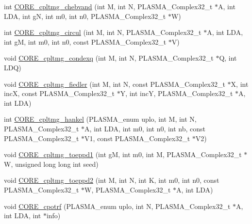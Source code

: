 \begin{DoxyCompactItemize}
\item 
int \hyperlink{group__CORE__PLASMA__Complex32__t_ga9a7cfbd866be2bca2d26375bc6766d8a_ga9a7cfbd866be2bca2d26375bc6766d8a}{C\+O\+R\+E\+\_\+cpltmg\+\_\+chebvand} (int M, int N, P\+L\+A\+S\+M\+A\+\_\+\+Complex32\+\_\+t $\ast$A, int L\+D\+A, int g\+N, int m0, int n0, P\+L\+A\+S\+M\+A\+\_\+\+Complex32\+\_\+t $\ast$W)
\item 
int \hyperlink{group__CORE__PLASMA__Complex32__t_ga90d60bf2517ad64e6d1bf64254ac929d_ga90d60bf2517ad64e6d1bf64254ac929d}{C\+O\+R\+E\+\_\+cpltmg\+\_\+circul} (int M, int N, P\+L\+A\+S\+M\+A\+\_\+\+Complex32\+\_\+t $\ast$A, int L\+D\+A, int g\+M, int m0, int n0, const P\+L\+A\+S\+M\+A\+\_\+\+Complex32\+\_\+t $\ast$V)
\item 
void \hyperlink{group__CORE__PLASMA__Complex32__t_gad81007d6e27dcb18279f6fd52b823157_gad81007d6e27dcb18279f6fd52b823157}{C\+O\+R\+E\+\_\+cpltmg\+\_\+condexq} (int M, int N, P\+L\+A\+S\+M\+A\+\_\+\+Complex32\+\_\+t $\ast$Q, int L\+D\+Q)
\item 
void \hyperlink{group__CORE__PLASMA__Complex32__t_gab1b369f8dae16a9ad1a6479f7566d0a6_gab1b369f8dae16a9ad1a6479f7566d0a6}{C\+O\+R\+E\+\_\+cpltmg\+\_\+fiedler} (int M, int N, const P\+L\+A\+S\+M\+A\+\_\+\+Complex32\+\_\+t $\ast$X, int inc\+X, const P\+L\+A\+S\+M\+A\+\_\+\+Complex32\+\_\+t $\ast$Y, int inc\+Y, P\+L\+A\+S\+M\+A\+\_\+\+Complex32\+\_\+t $\ast$A, int L\+D\+A)
\item 
int \hyperlink{group__CORE__PLASMA__Complex32__t_ga29113f4eaa98eeaa73019e2bef97b589_ga29113f4eaa98eeaa73019e2bef97b589}{C\+O\+R\+E\+\_\+cpltmg\+\_\+hankel} (P\+L\+A\+S\+M\+A\+\_\+enum uplo, int M, int N, P\+L\+A\+S\+M\+A\+\_\+\+Complex32\+\_\+t $\ast$A, int L\+D\+A, int m0, int n0, int nb, const P\+L\+A\+S\+M\+A\+\_\+\+Complex32\+\_\+t $\ast$V1, const P\+L\+A\+S\+M\+A\+\_\+\+Complex32\+\_\+t $\ast$V2)
\item 
void \hyperlink{group__CORE__PLASMA__Complex32__t_ga9c06098441579548f5ca4c3a2a60f376_ga9c06098441579548f5ca4c3a2a60f376}{C\+O\+R\+E\+\_\+cpltmg\+\_\+toeppd1} (int g\+M, int m0, int M, P\+L\+A\+S\+M\+A\+\_\+\+Complex32\+\_\+t $\ast$W, unsigned long long int seed)
\item 
void \hyperlink{group__CORE__PLASMA__Complex32__t_ga838d82deafcbbf70e56b5464ee0e7538_ga838d82deafcbbf70e56b5464ee0e7538}{C\+O\+R\+E\+\_\+cpltmg\+\_\+toeppd2} (int M, int N, int K, int m0, int n0, const P\+L\+A\+S\+M\+A\+\_\+\+Complex32\+\_\+t $\ast$W, P\+L\+A\+S\+M\+A\+\_\+\+Complex32\+\_\+t $\ast$A, int L\+D\+A)
\item 
void \hyperlink{group__CORE__PLASMA__Complex32__t_ga8f8839fe52398eb2b469caff40cdacd5_ga8f8839fe52398eb2b469caff40cdacd5}{C\+O\+R\+E\+\_\+cpotrf} (P\+L\+A\+S\+M\+A\+\_\+enum uplo, int N, P\+L\+A\+S\+M\+A\+\_\+\+Complex32\+\_\+t $\ast$A, int L\+D\+A, int $\ast$info)

\end{DoxyCompactItemize}
